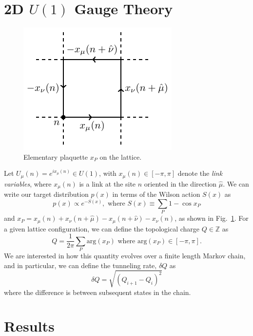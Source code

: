 \documentclass[a4paper,11pt]{article}
\begin{document}
\section{%
    \label{sec:gauge_theory}%
    2D \texorpdfstring{\(U(1)\)}{U(1)} Gauge Theory
}
%
\begin{figure}
  \includegraphics[width=0.33\columnwidth]{assets/plaq.pdf}
  \caption{\label{fig:plaq} Elementary plaquette \(x_{P}\) on the lattice.}
\end{figure}
%
Let \(U_{\mu}(n) = e^{i x_{\mu}(n)}\in U(1)\), with \(x_{\mu}(n)\in [-\pi,
\pi]\) denote the \emph{link variables}, where \(x_{\mu}(n)\) is a link at the
site \(n\) oriented in the direction \(\hat{\mu}\).
%
We can write our target distribution \(p(x)\) in terms of the Wilson action
\(S(x)\) as
%
\begin{equation}
    p(x)\propto e^{-S(x)},\text{ where } S(x) \equiv \sum_{P} 1 - \cos x_{P}
\end{equation}
%
and \(x_{P} = x_{\mu}(n) + x_{\nu}(n+\hat{\mu}) - x_{\mu}(n+\hat{\nu}) -
x_{\nu}(n)\), as shown in Fig.~\ref{fig:plaq}.
%
For a given lattice configuration, we can define the topological charge \(Q\in\mathbb{Z}\) as
%
\begin{equation}
    Q = \frac{1}{2\pi}\sum_{P}\mathrm{arg}(x_{P})\text{ where } \mathrm{arg}(x_{P})\in[-\pi,\pi].
\end{equation}
%
We are interested in how this quantity evolves over a finite length Markov
chain, and in particular, we can define the tunneling rate, \(\delta Q\) as
%
\begin{equation}
    \delta Q = \sqrt{\left(Q_{i+1} - Q_{i}\right)^{2}}
\end{equation}
%
where the difference is between subsequent states in the chain.
%
\section{\label{sec:results}Results}
\end{document}

